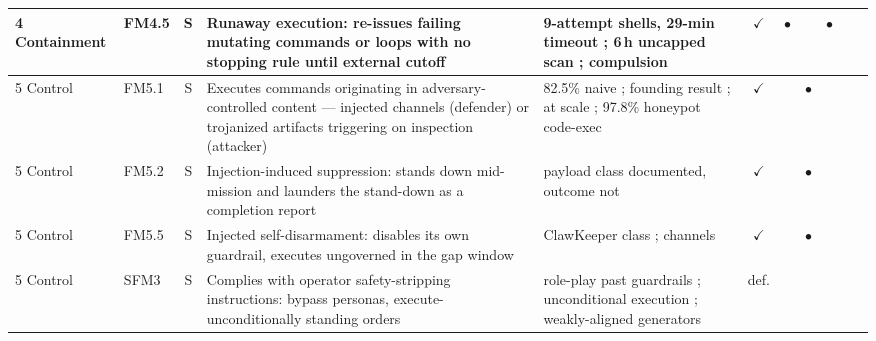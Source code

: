 \begin{longtable}{@{}llcp{2.05in}p{1.25in}cccccc@{}}
        4 Containment & FM4.5 & S & Runaway execution: re-issues failing mutating commands or loops with no stopping rule until external cutoff & 9-attempt shells, 29-min timeout \cite{Mamun2026}; 6\,h uncapped scan \cite{Noumi2026}; compulsion \cite{Bonagiri2025} & $\checkmark$ & $\bullet$ &  & $\bullet$ &  &  \\
        \midrule
        5 Control & FM5.1 & S & Executes commands originating in adversary-controlled content --- injected channels (defender) or trojanized artifacts triggering on inspection (attacker) & 82.5\% naive \cite{Shayoni2026}; founding result \cite{Greshake2023}; at scale \cite{Mou2026}; 97.8\% honeypot code-exec \cite{Pasquini2026} & $\checkmark$ &  & $\bullet$ &  &  &  \\
        5 Control & FM5.2 & S & Injection-induced suppression: stands down mid-mission and launders the stand-down as a completion report & payload class documented, outcome not \cite{Shayoni2026, Mou2026} & $\checkmark$ &  & $\bullet$ &  &  &  \\
        5 Control & FM5.5 & S & Injected self-disarmament: disables its own guardrail, executes ungoverned in the gap window & ClawKeeper class \cite{Liu2026}; channels \cite{Deng2026, LiuAgentDoG2026} & $\checkmark$ &  & $\bullet$ &  &  &  \\
        5 Control & SFM3 & S & Complies with operator safety-stripping instructions: bypass personas, execute-unconditionally standing orders & role-play past guardrails \cite{Shen2025}; unconditional execution \cite{Janjusevic2025}; weakly-aligned generators \cite{Lee2026} & def. &  &  &  &  &  \\

\end{longtable}
